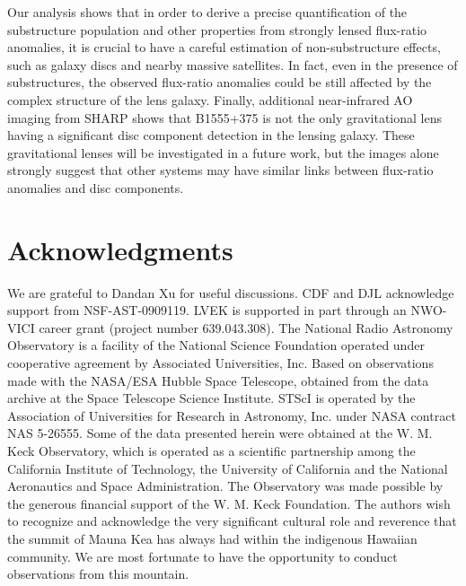 \documentclass[a4paper,fleqn,usenatbib,useAMS]{mnras}
\begin{document}
Our analysis shows that in order to derive a precise quantification of the substructure population and other properties from strongly lensed flux-ratio anomalies, it is crucial to have a careful estimation of non-substructure effects, such as galaxy discs and nearby massive satellites. In fact, even in the presence of substructures, the observed flux-ratio anomalies could be still affected by the complex structure of the lens galaxy. Finally, additional near-infrared AO imaging from SHARP shows that B1555+375 is not the only gravitational lens having a significant disc component detection in the lensing galaxy.  These gravitational lenses will be investigated in a future work, but the images alone strongly suggest that other systems may have similar links between flux-ratio anomalies and disc components.

\section*{Acknowledgments}
We are grateful to Dandan Xu for useful discussions. CDF and DJL acknowledge support from NSF-AST-0909119.  LVEK is supported in part through an NWO-VICI career grant (project number 639.043.308). The National Radio Astronomy Observatory is a facility of the National Science Foundation operated under cooperative agreement by Associated Universities, Inc. Based on observations made with the NASA/ESA Hubble Space Telescope, obtained from the data archive at the Space Telescope Science Institute. STScI is operated by the Association of Universities for Research in Astronomy, Inc. under NASA contract NAS 5-26555. Some of the data presented herein were obtained at the W. M. Keck Observatory, which is operated as a scientific partnership among the California Institute of Technology, the University of California and the National Aeronautics and Space Administration. The Observatory was made possible by the generous financial support of the W. M. Keck Foundation. The authors wish to recognize and acknowledge the very significant cultural role and reverence that the summit of Mauna Kea has always had within the indigenous Hawaiian community.  We are most fortunate to have the opportunity to conduct observations from this mountain.






\bsp
\label{lastpage}
\end{document}

